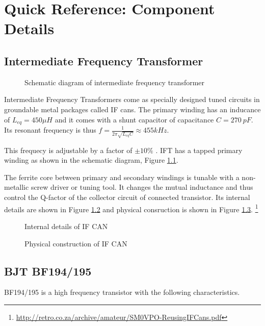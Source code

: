 \chapter {Quick Reference: Component Details}
\section{Intermediate Frequency Transformer}
\label{IFT}

\begin{figure}[ht]
\caption {Schematic diagram of intermediate frequency transformer}
\label{iftschem}
\end{figure}


Intermediate Frequency Transformers come as specially designed tuned circuits in groundable metal packages called IF cans. The primary winding has an inducance of $L_{eq}=450\mu H$ and it comes with a shunt capacitor of capacitance $C=270\ pF$. Its resonant frequency is thus $f=\frac{1}{2\pi\sqrt{L_{eq}C}}\approx 455 kHz$.

This frequecy is adjustable by a factor of $\pm 10 \%$ . IFT has a tapped primary winding as shown in the schematic diagram, Figure \ref{iftschem}. 

The ferrite core between primary and secondary windings is tunable with a non-metallic screw driver or tuning tool. It changes the mutual inductance and thus control the Q-factor of the collector circuit of connected transistor\cite{Tomasi}. Its internal details are shown in Figure \ref{ifcan2} and physical consruction is shown in Figure \ref{ifcan1}. \footnote{\url{http://retro.co.za/archive/amateur/SM0VPO-ReusingIFCans.pdf}}

\begin{figure}
\caption {Internal details of IF CAN}

\label{ifcan2}
\end{figure}
\begin{figure}[ht]
\caption {Physical construction of IF CAN}
\label{ifcan1}
\end{figure}


\section{BJT BF194/195}
\label{BF194/195}
BF194/195 is a high frequency transistor with the following characteristics. \\

